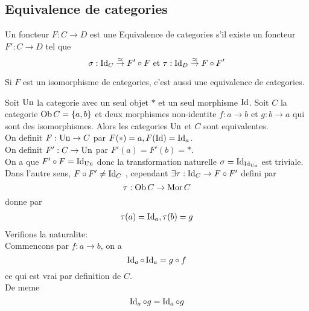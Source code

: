 \documentclass[../main.tex]{subfiles}
\begin{document}
\subsection{Equivalence de categories}
\begin{defn}
	Un foncteur $F:C \to D$ est une Equivalence de categories s'il existe un foncteur $F': C\to D$ tel que
	\[ 
	\sigma: \operatorname{Id}_C \overset{ \simeq }{\to} F'\circ F \text{ et } \tau: \operatorname{Id}_D \overset{ \simeq}{\to} F\circ F'
	\] 
	
\end{defn}
\begin{rmq}
Si $F$ est un isomorphisme de categories, c'est aussi une equivalence de categories.
\end{rmq}
\begin{exemple}
Soit $\operatorname{Un}$ la categorie avec un seul objet $\ast$ et un seul morphisme $\operatorname{Id}$. Soit $C$ la categorie $\operatorname{Ob} C= \left\{ a,b \right\} $ et deux morphismes non-identite $f:a\to b$ et $g:b\to a$ qui sont des isomorphismes. Alors les categories $\operatorname{Un}$ et $C$ sont equivalentes.\\
On definit $F :\operatorname{Un} \to C$  par $F( \ast) = a, F( \operatorname{Id}) = \operatorname{Id}_a$.\\
On definit $F': C \to \operatorname{Un}$ par $F'( a) = F'( b) = \ast$.\\
On a que $F'\circ F = \operatorname{Id}_{\operatorname{Un}} $ donc la transformation naturelle $\sigma= \operatorname{Id}_{\operatorname{Id}_{ \operatorname{Un} }} $ est triviale.\\
Dans l'autre sens, $F\circ F'\neq \operatorname{Id}_{C} $ , cependant $\exists \tau:\operatorname{Id}_C\to F\circ F'$ defini par
\[ 
\tau: \operatorname{Ob} C\to \operatorname{Mor} C
\]
donne par
\begin{align*}
	\tau( a) = \operatorname{Id}_a, \tau( b) =g
\end{align*}
Verifions la naturalite:\\
Commencons par $f:a\to b$, on a
\[ 
\operatorname{Id}_a \circ \operatorname{Id}_a = g \circ f 
\]
ce qui est vrai par definition de $C$.\\
De meme
\[ 
	\operatorname{Id}_a\circ g = \operatorname{Id}_a \circ g
\]

\end{exemple}
\end{document}
